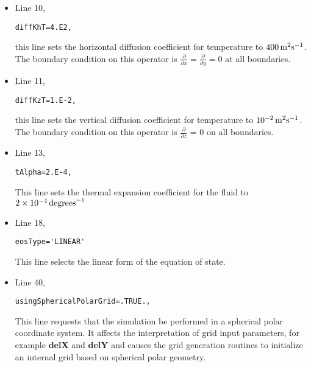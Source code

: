 \begin{itemize}
\item Line 10,
\begin{verbatim}
diffKhT=4.E2,
\end{verbatim}
this line sets the horizontal diffusion coefficient for temperature
to $400\,{\rm m^{2}s^{-1}}$. The boundary condition on this
operator is $\frac{\partial}{\partial x}=\frac{\partial}{\partial y}=0$ at
all boundaries.

\item Line 11,
\begin{verbatim}
diffKzT=1.E-2,
\end{verbatim}
this line sets the vertical diffusion coefficient for temperature
to $10^{-2}\,{\rm m^{2}s^{-1}}$. The boundary condition on this
operator is $\frac{\partial}{\partial z}$ = 0 on all boundaries.

\item Line 13,
\begin{verbatim}
tAlpha=2.E-4,
\end{verbatim}
This line sets the thermal expansion coefficient for the fluid
to $2 \times 10^{-4}\,{\rm degrees}^{-1}$


\item Line 18,
\begin{verbatim}
eosType='LINEAR'
\end{verbatim}
This line selects the linear form of the equation of state.




\item Line 40,
\begin{verbatim}
usingSphericalPolarGrid=.TRUE.,
\end{verbatim}
This line requests that the simulation be performed in a 
spherical polar coordinate system. It affects the interpretation of
grid input parameters, for example {\bf delX} and {\bf delY} and
causes the grid generation routines to initialize an internal grid based
on spherical polar geometry.



\end{itemize}
